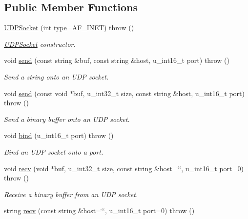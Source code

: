 \subsection*{Public Member Functions}
\begin{CompactItemize}
\item 
\hyperlink{classUDPSocket_7e2e6eb3a4c3eec5538bdfd89441802b}{UDPSocket} (int \hyperlink{classSocket_c7f6980f36023df2004271c336217cb8}{type}=AF\_\-INET)  throw ()
\begin{CompactList}\small\item\em \hyperlink{classUDPSocket}{UDPSocket} constructor. \item\end{CompactList}\item 
void \hyperlink{classUDPSocket_c7fbe4769e529544104649e6d9254d7d}{send} (const string \&buf, const string \&host, u\_\-int16\_\-t port)  throw ()
\begin{CompactList}\small\item\em Send a string onto an UDP socket. \item\end{CompactList}\item 
void \hyperlink{classUDPSocket_5bbc712a57056d84e0682541fe2f19cd}{send} (const void $\ast$buf, u\_\-int32\_\-t size, const string \&host, u\_\-int16\_\-t port)  throw ()
\begin{CompactList}\small\item\em Send a binary buffer onto an UDP socket. \item\end{CompactList}\item 
void \hyperlink{classUDPSocket_93ca497a5e6539eab464c4bd59a85de2}{bind} (u\_\-int16\_\-t port)  throw ()
\begin{CompactList}\small\item\em Bind an UDP socket onto a port. \item\end{CompactList}\item 
void \hyperlink{classUDPSocket_0ac43ab32b13c76ea9c639f6fc2314f3}{recv} (void $\ast$buf, u\_\-int32\_\-t size, const string \&host=\char`\"{}\char`\"{}, u\_\-int16\_\-t port=0)  throw ()
\begin{CompactList}\small\item\em Receive a binary buffer from an UDP socket. \item\end{CompactList}\item 
string \hyperlink{classUDPSocket_55f7c286551162013cf4011405d5e8eb}{recv} (const string \&host=\char`\"{}\char`\"{}, u\_\-int16\_\-t port=0)  throw ()

\end{CompactItemize}
